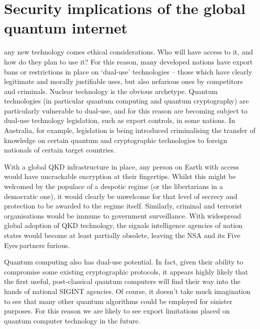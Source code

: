 %
%

\section{Security implications of the global quantum internet} \label{sec:sec_imp} 

\newline

 any new technology comes ethical considerations. Who will have access to it, and how do they plan to use it? For this reason, many developed nations have export bans or restrictions in place on `dual-use' technologies -- those which have clearly legitimate and morally justifiable uses, but also nefarious ones by competitors and criminals. Nuclear technology is the obvious archetype. Quantum technologies (in particular quantum computing and quantum cryptography) are particularly vulnerable to dual-use, and for this reason are becoming subject to dual-use technology legislation, such as export controls, in some nations. In Australia, for example, legislation is being introduced criminalising the transfer of knowledge on certain quantum and cryptographic technologies to foreign nationals of certain target countries.

With a global QKD infrastructure in place, any person on Earth with access would have uncrackable encryption at their fingertips. Whilst this might be welcomed by the populace of a despotic regime (or the libertarians in a democratic one), it would clearly be unwelcome for that level of secrecy and protection to be awarded to the regime itself. Similarly, criminal and terrorist organisations would be immune to government surveillance. With widespread global adoption of QKD technology, the signals intelligence agencies of nation states would become at least partially obsolete, leaving the NSA and its Five Eyes\texttrademark\,partners furious.

Quantum computing also has dual-use potential. In fact, given their ability to compromise some existing cryptographic protocols, it appears highly likely that the first useful, post-classical quantum computers will find their way into the hands of national SIGINT agencies. Of course, it doesn't take much imagination to see that many other quantum algorithms could be employed for sinister purposes. For this reason we are likely to see export limitations placed on quantum computer technology in the future.

